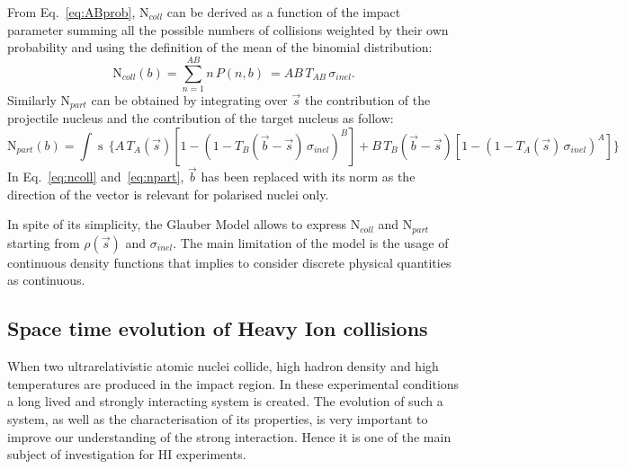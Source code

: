From Eq.~\ref{eq:ABprob}, $\mathrm{N}_{coll}$ can be derived as a function of the impact parameter 
summing all the possible numbers of collisions weighted by their own probability and using the
definition of the mean of the binomial distribution:
\begin{equation} \label{eq:ncoll}
    \mathrm{N}_{coll}(b) = \sum_{n=1}^{AB} n\, P(n,b) \ = AB\, T_{AB}\, \sigma_{inel}.
\end{equation}
Similarly $\mathrm{N}_{part}$ can be obtained by integrating over $\vec{s}$ the contribution of the
projectile nucleus and the contribution of the target nucleus as follow:
\begin{equation} \label{eq:npart}
    \mathrm{N}_{part}(b) = \int \mathop{d^{2}s} \, \bigl\{ A\, T_{A}(\vec{s})[1-(1- T_{B}(\vec{b}-\vec{s})\, \sigma_{inel})^{B}
    ] + B\, T_{B}(\vec{b}-\vec{s}) [1-(1-T_{A}(\vec{s})\,\sigma_{inel})^{A}] \bigr\}
\end{equation}
In Eq.~\ref{eq:ncoll} and~\ref{eq:npart}, $\vec{b}$ has been replaced with its norm as the direction 
of the vector is relevant for polarised nuclei only.

In spite of its simplicity, the Glauber Model allows to express $\mathrm{N}_{coll}$ and 
$\mathrm{N}_{part}$ starting from $\rho(\vec{s})$ and $\sigma_{inel}$. The main limitation of the model is the usage of continuous density functions that implies to consider discrete physical quantities 
as continuous.

%
\subsection{Space time evolution of Heavy Ion collisions} \label{sec:1.3.2}

When two ultrarelativistic atomic nuclei collide, high hadron density and high temperatures
are produced in the impact region. 
In these experimental conditions a long lived and strongly interacting system is created.
The evolution of such a system, as well as the characterisation of its properties, is very important
to improve our understanding of the strong interaction. Hence it is one of the main subject of 
investigation for HI experiments.

